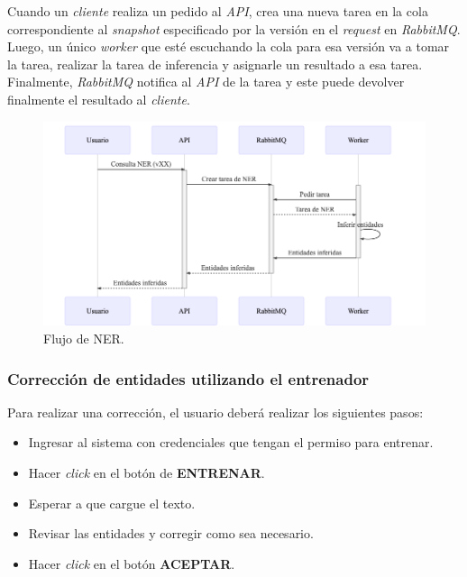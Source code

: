 \documentclass[12pt,a4paper,]{scrartcl}
\providecommand{\tightlist}{%
  \setlength{\itemsep}{0pt}\setlength{\parskip}{0pt}}
\begin{document}
Cuando un \emph{cliente} realiza un pedido al \emph{API}, crea una nueva tarea en la cola correspondiente al \emph{snapshot} especificado por la versión en el \emph{request} en \emph{RabbitMQ}. Luego, un único \emph{worker} que esté escuchando la cola para esa versión va a tomar la tarea, realizar la tarea de inferencia y asignarle un resultado a esa tarea. Finalmente, \emph{RabbitMQ} notifica al \emph{API} de la tarea y este puede devolver finalmente el resultado al \emph{cliente}.

\begin{figure}[H]

{\centering \includegraphics{assets/mermaid/scenarios-ner.png} 

}

\caption{Flujo de NER.}\label{fig:scenarios-ner}
\end{figure}

\hypertarget{correcciuxf3n-de-entidades-utilizando-el-entrenador}{%
\subsubsection{Corrección de entidades utilizando el entrenador}\label{correcciuxf3n-de-entidades-utilizando-el-entrenador}}

Para realizar una corrección, el usuario deberá realizar los siguientes pasos:

\begin{itemize}
\tightlist
\item
  Ingresar al sistema con credenciales que tengan el permiso para entrenar.
\item
  Hacer \emph{click} en el botón de \textbf{ENTRENAR}.
\item
  Esperar a que cargue el texto.
\item
  Revisar las entidades y corregir como sea necesario.
\item
  Hacer \emph{click} en el botón \textbf{ACEPTAR}.
\end{itemize}
\end{document}
